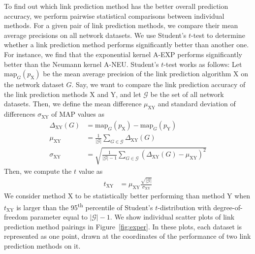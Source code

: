 \documentclass[11pt,a4paper]{book}
\begin{document}
To find out which link prediction method has the better overall
prediction accuracy, we perform pairwise statistical comparisons between
individual methods. For a given pair
of link prediction methods, we compare their mean average precisions on
all network datasets.  We use Student's $t$-test to determine
whether a link prediction method performs significantly better than
another one.  For instance, we find that the exponential kernel
\mbox{\textrm{A-EXP}} performs significantly better than the Neumann kernel
\textrm{A-NEU}.  
Student's $t$-test works as follows:  Let
$\mathrm{map}_G(p_{\textrm{X}})$ be the mean average precision of the
link prediction algorithm \textrm X on the network dataset $G$.  Say, we
want to compare the link prediction accuracy of the link prediction
methods \textrm X and \textrm Y, and let $\mathcal G$ be the set of all
network datasets.  Then, we define the mean difference $\mu_{\textrm{XY}}$ and
standard deviation of differences $\sigma_{\textrm{XY}}$ of MAP values as
\begin{align}
  \Delta_{\textrm{XY}}(G) &= \mathrm{map}_G(p_{\textrm{X}}) -
  \mathrm{map}_G(p_{\textrm{Y}}) \\ 
  \mu_{\textrm{XY}} &= \frac 1 {|\mathcal G|} \sum_{G \in \mathcal G}
  \Delta_{\textrm{XY}}(G) \\ 
  \sigma_{\textrm{XY}} &= \sqrt{\frac 1 {|\mathcal G|-1} \sum_{G \in
      \mathcal G} (\Delta_{\textrm{XY}}(G) - \mu_{\textrm{XY}})^2} 
\end{align}
Then, we compute the $t$ value as
\begin{align}
  t_{\textrm{XY}} &= \mu_{\textrm{XY}} \frac {\sqrt{|\mathcal G|}} {\sigma_{\textrm{XY}}}
\end{align}
We consider method \textrm X to be statistically better performing than
method \textrm Y when $t_{\textrm{XY}}$ is larger than the
95\textsuperscript{th} percentile of Student's $t$-distribution
with degree-of-freedom parameter equal to $|\mathcal G|-1$. 
We show individual scatter plots of link prediction method pairings in
Figure~\ref{fig:exper}.  In these plots, each dataset is represented as
one point, drawn at the coordinates of the performance of two link
prediction methods on it. 
\end{document}
